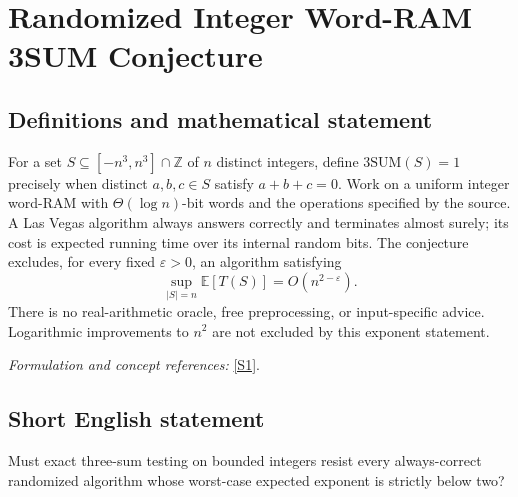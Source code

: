 \documentclass[11pt,a4paper]{article}
\newcommand{\Z}{\mathbb{Z}}
\newcommand{\E}{\mathbb{E}}
\newcommand{\eps}{\varepsilon}
\newcommand{\sref}[2]{\hyperlink{source:#1:#2}{[S#2]}}
\newif\ifshowcatalogue
\newcommand{\cataloguescope}[1]{\ifshowcatalogue
 \paragraph{Exact scope in the supplied catalogue.}
 \begin{quote}\small #1\end{quote}\fi}
\numberwithin{equation}{section}
\begin{document}
\setcounter{section}{0}
\clearpage
\section*{\texorpdfstring{Randomized Integer Word-RAM 3SUM Conjecture}{Randomized Integer Word-RAM 3SUM Conjecture}}\label{30006762}
\subsection{Definitions and mathematical statement}
For a set $S\subseteq[-n^3,n^3]\cap\Z$ of $n$ distinct integers, define
$\mathrm{3SUM}(S)=1$ precisely when distinct $a,b,c\in S$ satisfy $a+b+c=0$. Work on a uniform integer word-RAM with $\Theta(\log n)$-bit words and the operations specified by the source. A Las Vegas algorithm always answers correctly and terminates almost surely; its cost is expected running time over its internal random bits. The conjecture excludes, for every fixed $\eps>0$, an algorithm satisfying
\[
 \sup_{|S|=n}\E[T(S)]=O(n^{2-\eps}).
\]
There is no real-arithmetic oracle, free preprocessing, or input-specific advice. Logarithmic improvements to $n^2$ are not excluded by this exponent statement.
\par\smallskip\textit{Formulation and concept references:} \sref{30006762}{1}.
\cataloguescope{For every epsilon>0, there is no uniform Las Vegas randomized integer word-RAM algorithm that, on every set S of n distinct integers in [-n\textasciicircum{}3,n\textasciicircum{}3], decides whether three distinct elements sum to zero in worst-case expected O(n\textasciicircum{}(2-epsilon)) time. Use the standard logarithmic-word model of Abboud–Vassilevska Williams Conjecture 1, with enough Theta(log n) bits for the input universe, unit-cost word arithmetic, comparisons, Boolean operations, shifts and indirect memory access; no real-number oracle or free input-dependent preprocessing is permitted. Las Vegas means an always-correct answer with almost-sure termination, expectation over internal randomness, and a bound uniform over all valid inputs. Constants may depend on the algorithm and epsilon. This is not a literal quadratic lower bound.}
\subsection{Short English statement}
Must exact three-sum testing on bounded integers resist every always-correct randomized algorithm whose worst-case expected exponent is strictly below two?
\end{document}
